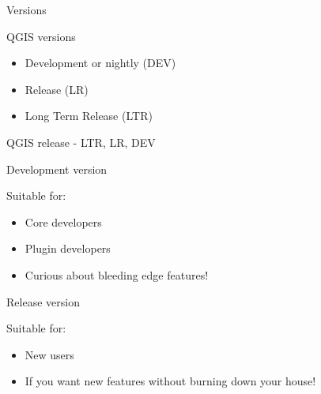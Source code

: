 \begin{frame}{Versions}
	\begin{block}{QGIS versions}
		\begin{itemize}
			\item Development or nightly (DEV)
			\item Release (LR) 
			\item Long Term Release (LTR)
		\end{itemize}
	\end{block}
\end{frame}

\begin{frame}{QGIS release - LTR, LR, DEV}
\end{frame}

\begin{frame}{Development version}
	\begin{block}{Suitable for:}
		\begin{itemize}
			\item Core developers
			\item Plugin developers
			\item Curious about bleeding edge features!
		\end{itemize}
	\end{block}
\end{frame}

\begin{frame}{Release version}
	\begin{block}{Suitable for:}
		\begin{itemize}
			\item New users
			\item If you want new features without burning down your house!
		\end{itemize}
	\end{block}
\end{frame}

